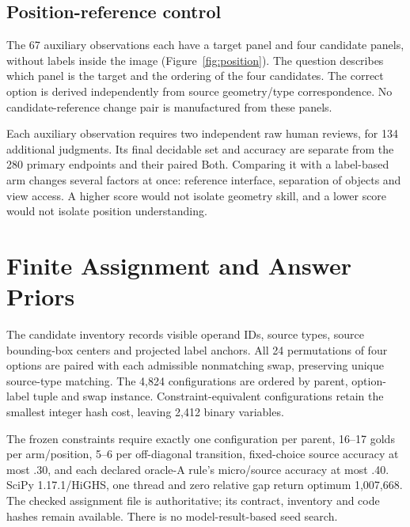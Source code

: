 \documentclass[10pt,twocolumn,letterpaper]{article}
\begin{document}
\subsection{Position-reference control}
The 67 auxiliary observations each have a target panel and four
candidate panels, without labels inside the image
(Figure~\ref{fig:position}). The question describes which panel is
the target and the ordering of the four candidates. The correct option
is derived independently from source geometry/type correspondence.
No candidate-reference change pair is manufactured from these panels.

Each auxiliary observation requires two independent raw human reviews,
for 134 additional judgments. Its final decidable set and accuracy
are separate from the 280 primary endpoints and their paired Both.
Comparing it with a label-based arm changes several factors at once:
reference interface, separation of objects and view access. A higher
score would not isolate geometry skill, and a lower score would not
isolate position understanding.

\section{Finite Assignment and Answer Priors}
The candidate inventory records visible operand IDs, source types,
source bounding-box centers and projected label anchors. All 24
permutations of four options are paired with each admissible nonmatching
swap, preserving unique source-type matching. The 4,824 configurations
are ordered by parent, option-label tuple and swap instance.
Constraint-equivalent configurations retain the smallest integer hash
cost, leaving 2,412 binary variables.

The frozen constraints require exactly one configuration per parent,
16--17 golds per arm/position, 5--6 per off-diagonal transition,
fixed-choice source accuracy at most .30, and each declared oracle-A
rule's micro/source accuracy at most .40. SciPy 1.17.1/HiGHS, one thread
and zero relative gap return optimum 1,007,668. The checked assignment
file is authoritative; its contract, inventory and code hashes remain
available. There is no model-result-based seed search.

\begin{table}[H]
\centering\small
\caption{Transition counts: rows are A gold, columns B gold.
Left: frozen Color (73). Right: optimized Part-type (67).}
\label{tab:transitions}
\hspace{12pt}

\end{table}
\end{document}
